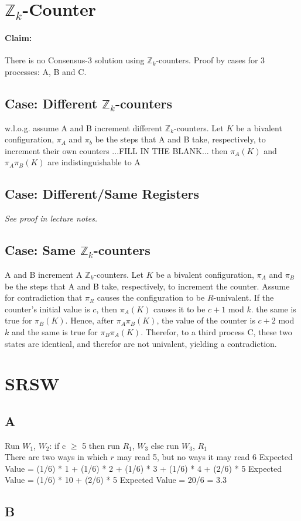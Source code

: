 \documentclass[11pt]{article}
\begin{document}
\section{$\mathbb{Z}_k$-Counter}
\paragraph{Claim:} There is no Consensus-3 solution using $\mathbb{Z}_k$-counters.
Proof by cases for 3 processes: A, B and C.
\subsection{Case: Different $\mathbb{Z}_k$-counters}
    w.l.o.g. assume A and B increment different $\mathbb{Z}_k$-counters. Let $K$ be a bivalent configuration, $\pi_A$ and $\pi_b$ be the steps that A and B take, respectively, to increment their own counters ...FILL IN THE BLANK... then $\pi_A(K)$ and $\pi_A\pi_B(K)$ are indistinguishable to A
\subsection{Case: Different/Same Registers} 
    \textit{See proof in lecture notes.}
\subsection{Case: Same $\mathbb{Z}_k$-counters}
    A and B increment A $\mathbb{Z}_k$-counters. Let $K$ be a bivalent configuration, $\pi_A$ and $\pi_B$ be the steps that A and B take, respectively, to increment the counter. Assume for contradiction that $\pi_R$ causes the configuration to be $R$-univalent. If the counter's initial value is $c$, then $\pi_A(K)$ causes it to be $c+1$ mod $k$. the same is true for $\pi_B(K)$. Hence, after $\pi_A\pi_B(K)$, the value of the counter is $c+2$ mod $k$ and the same is true for $\pi_B\pi_A(K)$. Therefor, to a third process C, these two states are identical, and therefor are not univalent, yielding a contradiction.

\section{SRSW}
\subsection{A} 
Run $W_1$, $W_2$: if c $\geq$ 5 then run $R_1$, $W_3$ else run $W_3$, $R_1$\\
There are two ways in which $r$ may read 5, but no ways it may read 6
Expected Value = (1/6) * 1 + (1/6) * 2 + (1/6) * 3 + (1/6) * 4 + (2/6) * 5 
Expected Value = (1/6) * 10 + (2/6) * 5
Expected Value = 20/6 = 3.3

\subsection{B}
\end{document}
